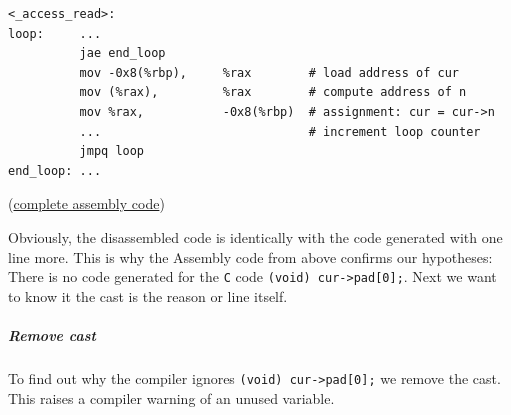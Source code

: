 \begin{Shaded}
\begin{Highlighting}[]
  
   \NormalTok{l * cur = &list[}\NormalTok{];}
   
  \NormalTok{(} 
  \NormalTok{\}}
   
\NormalTok{\}}
\end{Highlighting}
\end{Shaded}

\begin{verbatim}
<_access_read>:
loop:     ...
          jae end_loop
          mov -0x8(%rbp),     %rax        # load address of cur
          mov (%rax),         %rax        # compute address of n
          mov %rax,           -0x8(%rbp)  # assignment: cur = cur->n
          ...                             # increment loop counter
          jmpq loop
end_loop: ...
\end{verbatim}

(\href{https://github.com/cksystemsgroup/SemanticLocality/blob/localizer/experiments/localizer/__meeting_20161130/assembly_tests/exp_ll_remove_cmd.txt}{complete
assembly code})

Obviously, the disassembled code is identically with the code generated
with one line more. This is why the Assembly code from above confirms
our hypotheses: There is no code generated for the \texttt{C} code
\texttt{(void)\ cur-\textgreater{}pad{[}0{]};}. Next we want to know it
the cast is the reason or line itself.

\hypertarget{remove-cast}{\subparagraph{Remove cast}\label{remove-cast}}

To find out why the compiler ignores
\texttt{(void)\ cur-\textgreater{}pad{[}0{]};} we remove the cast. This
raises a compiler warning of an unused variable.

\begin{Shaded}
\begin{Highlighting}[]
  
   \NormalTok{l * cur = &list[}\NormalTok{];}
   
  \NormalTok{(} 
    \NormalTok{cur->pad[}\NormalTok{];}
  \NormalTok{\}}
   
\NormalTok{\}}
\end{Highlighting}
\end{Shaded}

